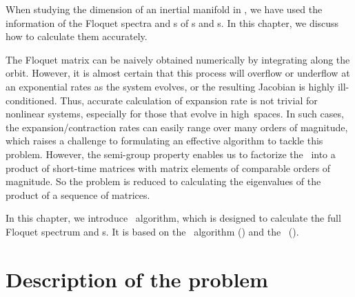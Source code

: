 
When studying the dimension of an inertial manifold in , we have
used the information of the Floquet spectra and \Fv s of \ppo s and \rpo s.
In this chapter, we discuss how to calculate them accurately.

The Floquet matrix can be naively obtained numerically by
integrating 
along the orbit.
However, it is almost certain that this process will overflow or
underflow at an exponential rates as the system evolves, or the
resulting Jacobian is highly ill-conditioned. Thus,
accurate calculation of expansion rate
is not trivial for nonlinear systems, especially for
those that evolve in high\dmn\ spaces. In such cases, the
expansion/contraction rates can easily range over many orders of magnitude,
which raises a challenge to formulating an effective algorithm to tackle this
problem. However, the semi-group property  enables
us to factorize the \JacobianM\ into a
product of short-time matrices with matrix elements of
comparable orders of magnitude.
So the problem is reduced to calculating the eigenvalues of the product
of a sequence of matrices.

In this chapter, we introduce \ped\ algorithm, which is designed to calculate the
full Floquet spectrum and \Fv s. It is
based on the \cLv\ algorithm () and the \psd\
().

\section{Description of the problem}
\label{sect:problem}

